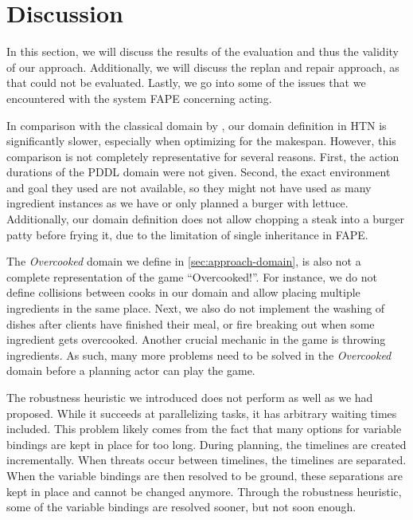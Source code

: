 \section{Discussion}\label{sec:discussion}

In this section, we will discuss the results of the evaluation and thus the validity of our approach.
Additionally, we will discuss the replan and repair approach, as that could not be evaluated. 
Lastly, we go into some of the issues that we encountered with the system \ac{FAPE} concerning acting.

In comparison with the classical domain by \cite{yuxinliuPlanningOvercookedGame2020}, our domain definition in \ac{HTN} is significantly slower, especially when optimizing for the makespan.
However, this comparison is not completely representative for several reasons.
First, the action durations of the \ac{PDDL} domain were not given.
Second, the exact environment and goal they used are not available, so they might not have used as many ingredient instances as we have or only planned a burger with lettuce.
Additionally, our domain definition does not allow chopping a steak into a burger patty before frying it, due to the limitation of single inheritance in \ac{FAPE}.

The \textit{Overcooked} domain we define in \ref{sec:approach-domain}, is also not a complete representation of the game ``Overcooked!''.
For instance, we do not define collisions between cooks in our domain and allow placing multiple ingredients in the same place.
Next, we also do not implement the washing of dishes after clients have finished their meal, or fire breaking out when some ingredient gets overcooked.
Another crucial mechanic in the game is throwing ingredients.
As such, many more problems need to be solved in the \textit{Overcooked} domain before a planning actor can play the game.

The robustness heuristic we introduced does not perform as well as we had proposed.
While it succeeds at parallelizing tasks, it has arbitrary waiting times included.
This problem likely comes from the fact that many options for variable bindings are kept in place for too long.
During planning, the timelines are created incrementally.
When threats occur between timelines, the timelines are separated.
When the variable bindings are then resolved to be ground, these separations are kept in place and cannot be changed anymore.
Through the robustness heuristic, some of the variable bindings are resolved sooner, but not soon enough.

